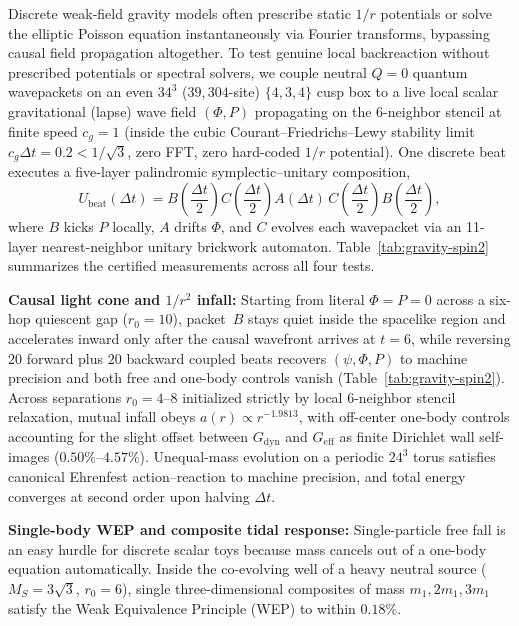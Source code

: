 Discrete weak-field gravity models often prescribe static $1/r$ potentials or solve the elliptic Poisson equation
instantaneously via Fourier transforms, bypassing causal field propagation altogether. To test genuine local
backreaction without prescribed potentials or spectral solvers, we couple neutral $Q = 0$ quantum wavepackets on an even
$34^3$ ($39{,}304$-site) $\{4,3,4\}$ cusp box to a live local scalar gravitational (lapse) wave field $(\Phi, P)$
propagating on the 6-neighbor stencil at finite speed $c_g = 1$ (inside the cubic Courant--Friedrichs--Lewy stability
limit $c_g \Delta t = 0.2 < 1/\sqrt{3}$, zero FFT, zero hard-coded $1/r$ potential). One discrete beat executes a
five-layer palindromic symplectic--unitary composition,
\begin{equation}
U_{\mathrm{beat}}(\Delta t)
= B\!\left(\frac{\Delta t}{2}\right)
  C\!\left(\frac{\Delta t}{2}\right)
  A(\Delta t)\,
  C\!\left(\frac{\Delta t}{2}\right)
  B\!\left(\frac{\Delta t}{2}\right),
\label{eq:gravity-beat}
\end{equation}
where $B$ kicks $P$ locally, $A$ drifts $\Phi$, and $C$ evolves each wavepacket via an 11-layer nearest-neighbor unitary
brickwork automaton. Table~\ref{tab:gravity-spin2} summarizes the certified measurements across all four tests.

\textbf{Causal light cone and $1/r^2$ infall:} Starting from literal $\Phi = P = 0$ across a six-hop quiescent gap
($r_0 = 10$), packet~$B$ stays quiet inside the spacelike region and accelerates inward only after the causal wavefront
arrives at $t = 6$, while reversing $20$ forward plus $20$ backward coupled beats recovers $(\psi, \Phi, P)$ to machine
precision and both free and one-body controls vanish (Table~\ref{tab:gravity-spin2}). Across separations
$r_0 = 4\text{--}8$ initialized strictly by local 6-neighbor stencil relaxation, mutual infall obeys
$a(r) \propto r^{-1.9813}$, with off-center one-body controls accounting for the slight offset between
$G_{\mathrm{dyn}}$ and $G_{\mathrm{eff}}$ as finite Dirichlet wall self-images ($0.50\%\text{--}4.57\%$). Unequal-mass
evolution on a periodic $24^3$ torus satisfies canonical Ehrenfest action--reaction to machine precision, and total
energy converges at second order upon halving $\Delta t$.

\textbf{Single-body WEP and composite tidal response:} Single-particle free fall is an easy hurdle for discrete scalar
toys because mass cancels out of a one-body equation automatically. Inside the co-evolving well of a heavy neutral
source ($M_S = 3\sqrt{3}$, $r_0 = 6$), single three-dimensional composites of mass $m_1, 2m_1, 3m_1$ satisfy the Weak
Equivalence Principle (WEP) to within $0.18\%$.

